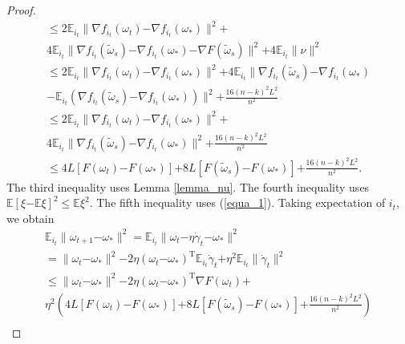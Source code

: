 \documentclass[letterpaper]{article}
\begin{document}
\begin{proof}
\begin{equation}
\begin{array}{ll}
\le 2\mathbb{E}_{i_t} \parallel \nabla f_{i_{t}}(\omega_{t}) \mathrm{-} \nabla f_{i_{t}}(\omega_{\ast}) \parallel^2  \mathrm{+} \\
4 \mathbb{E}_{i_t} \parallel  \nabla f_{i_{t}}(\tilde{\omega}_{s}) \mathrm{-} \nabla f_{i_{t}}(\omega_{\ast}) \mathrm{-} \nabla F(\tilde{\omega}_s) \parallel^2 \mathrm{+} 4\mathbb{E}_{i_t} \parallel \nu  \parallel^2 \\ 
\le 2\mathbb{E}_{i_t} \parallel \nabla f_{i_{t}}(\omega_{t}) \mathrm{-} \nabla f_{i_{t}}(\omega_{\ast}) \parallel^2  \mathrm{+} 4 \mathbb{E}_{i_t} \parallel  \nabla f_{i_{t}}(\tilde{\omega}_{s}) \mathrm{-} \nabla f_{i_{t}}(\omega_{\ast}) \\
\mathrm{-} \mathbb{E}_{i_t} \left ( \nabla f_{i_t}(\tilde{\omega}_s) \mathrm{-} \nabla f_{i_t}(\omega_\ast)   \right)\parallel^2   \mathrm{+} \frac{16(n-k)^2L^2}{n^2}   \\ 
\le 2\mathbb{E}_{i_t} \parallel \nabla f_{i_{t}}(\omega_{t}) \mathrm{-} \nabla f_{i_{t}}(\omega_{\ast}) \parallel^2  \mathrm{+} \\
4 \mathbb{E}_{i_t} \parallel  \nabla f_{i_{t}}(\tilde{\omega}_{s}) \mathrm{-} \nabla f_{i_{t}}(\omega_{\ast}) \parallel^2 \mathrm{+} \frac{16(n-k)^2L^2}{n^2} \\
\le 4L [F(\omega_t)\mathrm{-}F(\omega_\ast)] \mathrm{+}  8L [F(\tilde{\omega}_s)\mathrm{-}F(\omega_\ast)] \mathrm{+} \frac{16(n-k)^2L^2}{n^2}.
\end{array} 
\end{equation}  The third inequality uses Lemma \ref{lemma_nu}. The fourth inequality uses $\mathbb{E}[\xi\mathrm{-}\mathbb{E}\xi]^2 \le \mathbb{E}\xi^2$. The fifth inequality uses (\ref{equa_1}). Taking expectation of $i_t$, we obtain 
\begin{equation}
\begin{array}{ll}
\mathbb{E}_{i_t}\parallel  \omega_{t+1}\mathrm{-}\omega_\ast \parallel^2 = \mathbb{E}_{i_t}\parallel  \omega_{t}\mathrm{-}\eta\dot{\gamma}_t\mathrm{-}\omega_\ast \parallel^2\\
=\parallel  \omega_{t}\mathrm{-}\omega_\ast  \parallel^2  \mathrm{-}2\eta(\omega_t\mathrm{-}\omega_\ast)^\mathrm{T}\mathbb{E}_{i_t}\dot{\gamma}_{t}  \mathrm{+}  \eta^2 \mathbb{E}_{i_t}\parallel  \dot{\gamma}_{t}  \parallel^2  \\
\le \parallel  \omega_{t}\mathrm{-}\omega_\ast  \parallel^2  \mathrm{-}2\eta(\omega_t\mathrm{-}\omega_\ast)^\mathrm{T}\nabla F(\omega_t) \mathrm{+} \\
\eta^2 \left(  4L [F(\omega_t)\mathrm{-}F(\omega_\ast)] \mathrm{+} 8L [F(\tilde{\omega}_s)\mathrm{-}F(\omega_\ast)] \mathrm{+} \frac{16(n-k)^2L^2}{n^2} \right)  \\ 

\end{array}
\end{equation}
\end{proof}
\end{document}
